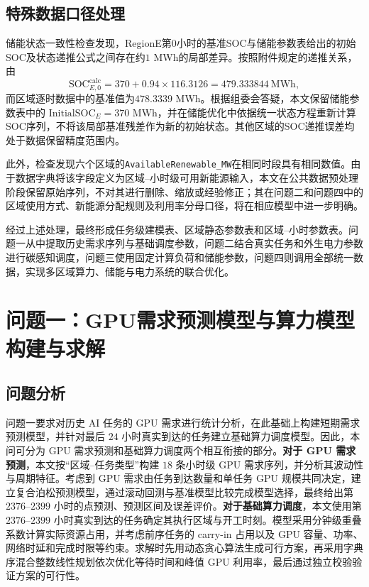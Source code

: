 \documentclass[UTF8,a4paper,zihao=-4]{ctexart}
\begin{document}
\subsection{特殊数据口径处理}

储能状态一致性检查发现，RegionE第$0$小时的基准SOC与储能参数表给出的初始SOC及状态递推公式之间存在约$1$ MWh的局部差异。按照附件规定的递推关系，由
\[
\mathrm{SOC}_{E,0}^{\mathrm{calc}}
=
370+0.94\times116.3126
=
479.333844\ \mathrm{MWh},
\]
而区域逐时数据中的基准值为$478.3339$ MWh。根据组委会答疑，本文保留储能参数表中的
$\mathrm{InitialSOC}_{E}=370$ MWh，并在储能优化中依据统一状态方程重新计算SOC序列，不将该局部基准残差作为新的初始状态。其他区域的SOC递推误差均处于数据保留精度范围内。

此外，检查发现六个区域的\texttt{AvailableRenewable\_MW}在相同时段具有相同数值。由于数据字典将该字段定义为区域--小时级可用新能源输入，本文在公共数据预处理阶段保留原始序列，不对其进行删除、缩放或经验修正；其在问题二和问题四中的区域使用方式、新能源分配规则及利用率分母口径，将在相应模型中进一步明确。

经过上述处理，最终形成任务级建模表、区域静态参数表和区域--小时参数表。问题一从中提取历史需求序列与基础调度参数，问题二结合真实任务和外生电力参数进行碳感知调度，问题三使用固定计算负荷和储能参数，问题四则调用全部统一数据，实现多区域算力、储能与电力系统的联合优化。

\section{问题一：GPU需求预测模型与算力模型构建与求解}
\FloatBarrier


\subsection{问题分析}
\label{sec:q1-analysis}

问题一要求对历史 AI 任务的 GPU 需求进行统计分析，在此基础上构建短期需求预测模型，并针对最后 $24$ 小时真实到达的任务建立基础算力调度模型。因此，本问可分为 GPU 需求预测和基础算力调度两个相互衔接的部分。\textbf{对于 GPU 需求预测}，本文按“区域--任务类型”构建 $18$ 条小时级 GPU 需求序列，并分析其波动性与周期特征。考虑到 GPU 需求由任务到达数量和单任务 GPU 规模共同决定，建立复合泊松预测模型，通过滚动回测与基准模型比较完成模型选择，最终给出第 $2376$--$2399$ 小时的点预测、预测区间及误差评价。\textbf{对于基础算力调度}，本文使用第 $2376$--$2399$ 小时真实到达的任务确定其执行区域与开工时刻。模型采用分钟级重叠系数计算实际资源占用，并考虑前序任务的 carry-in 占用以及 GPU 容量、功率、网络时延和完成时限等约束。求解时先用动态贪心算法生成可行方案，再采用字典序混合整数线性规划依次优化等待时间和峰值 GPU 利用率，最后通过独立校验验证方案的可行性。
\end{document}
